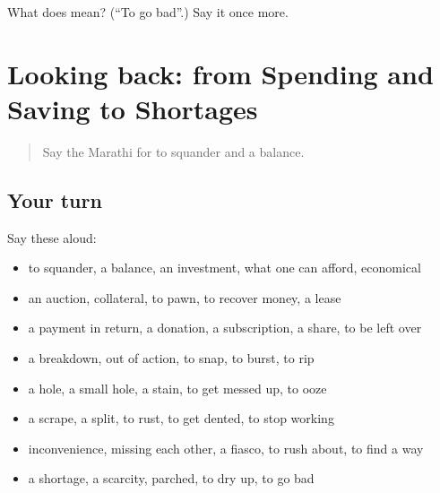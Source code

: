\begin{tcolorbox}[breakable,colback=teal!4,colframe=teal!35!black,title={Before you move on}]
What does  mean? (\textquotedblleft{}To go bad\textquotedblright{}.) Say it once more.
\end{tcolorbox}
\section[(dialogue)]{Looking back: from Spending and Saving to Shortages}

\label{lesson:MR-R435-review-428-435}



\begin{quote}
Say the Marathi for to squander and a balance.
\end{quote}

\subsection*{Your turn}
Say these aloud:

\begin{itemize}
\raggedright
  \item to squander, a balance, an investment, what one can afford, economical
  \item an auction, collateral, to pawn, to recover money, a lease
  \item a payment in return, a donation, a subscription, a share, to be left over
  \item a breakdown, out of action, to snap, to burst, to rip
  \item a hole, a small hole, a stain, to get messed up, to ooze
  \item a scrape, a split, to rust, to get dented, to stop working
  \item inconvenience, missing each other, a fiasco, to rush about, to find a way
  \item a shortage, a scarcity, parched, to dry up, to go bad
\end{itemize}


